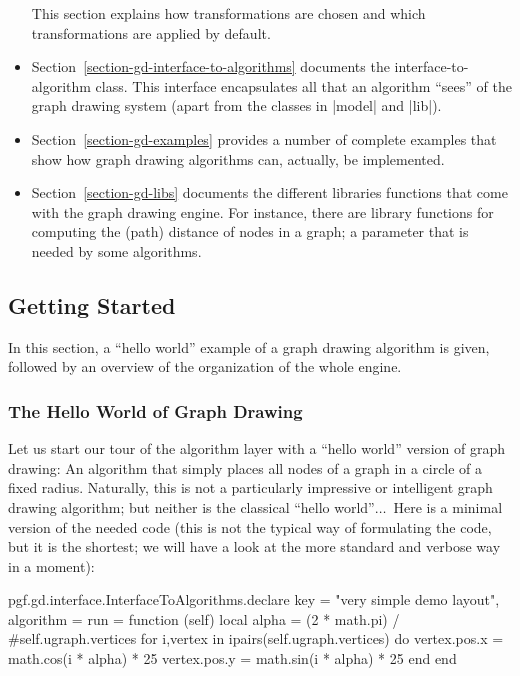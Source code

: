 \begin{itemize}
  This section explains how transformations are chosen and which
  transformations are applied by default.
\item Section~\ref{section-gd-interface-to-algorithms} documents the
  interface-to-algorithm class. This interface encapsulates all that
  an algorithm ``sees'' of the graph drawing system (apart from the
  classes in |model| and |lib|).
\item Section~\ref{section-gd-examples} provides a number of complete
  examples that show how graph drawing algorithms can, actually, be
  implemented. 
\item Section~\ref{section-gd-libs} documents the different
  libraries functions that come with the graph drawing engine. For
  instance, there are library functions for computing the (path)
  distance of nodes in a graph; a parameter that is needed by some
  algorithms.
\end{itemize}



\subsection{Getting Started}

In this section, a ``hello world'' example of a graph
drawing algorithm  is given, followed by an overview of the
organization of the whole engine.


\subsubsection{The Hello World of Graph Drawing}

Let us start our tour of the algorithm layer with a ``hello world''
version of graph drawing: An algorithm that simply places all nodes of
a graph in a circle of a fixed radius. Naturally, this is not a
particularly impressive or intelligent graph drawing algorithm; but
neither is the classical ``hello world''$\dots$\ Here is a minimal
version of the needed code (this is not the typical way of formulating
the code, but it is the shortest; we will have a look at the more
standard and verbose way in a moment):

\begin{codeexample}
pgf.gd.interface.InterfaceToAlgorithms.declare {
  key = "very simple demo layout",
  algorithm = {
    run =
      function (self)
        local alpha = (2 * math.pi) / #self.ugraph.vertices
        for i,vertex in ipairs(self.ugraph.vertices) do
          vertex.pos.x = math.cos(i * alpha) * 25
          vertex.pos.y = math.sin(i * alpha) * 25
        end
      end
  }
}
\end{codeexample}

